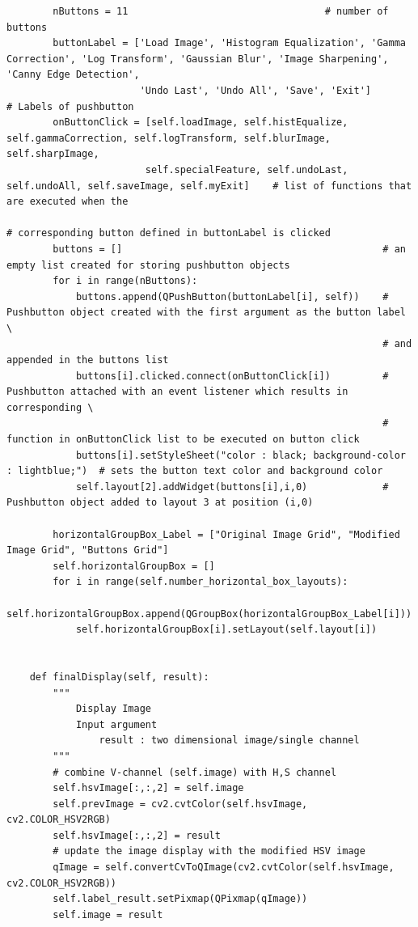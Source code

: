 \documentclass[letterpaper, 10 pt, conference]{ieeeconf}  %
\begin{document}
\begin{mdframed}
\begin{lstlisting}
        nButtons = 11                                  # number of buttons
        buttonLabel = ['Load Image', 'Histogram Equalization', 'Gamma Correction', 'Log Transform', 'Gaussian Blur', 'Image Sharpening', 'Canny Edge Detection', 
                       'Undo Last', 'Undo All', 'Save', 'Exit']          # Labels of pushbutton
        onButtonClick = [self.loadImage, self.histEqualize, self.gammaCorrection, self.logTransform, self.blurImage, self.sharpImage, 
                        self.specialFeature, self.undoLast, self.undoAll, self.saveImage, self.myExit]    # list of functions that are executed when the 
                                                                                                # corresponding button defined in buttonLabel is clicked
        buttons = []                                             # an empty list created for storing pushbutton objects
        for i in range(nButtons):
            buttons.append(QPushButton(buttonLabel[i], self))    # Pushbutton object created with the first argument as the button label \
                                                                 # and appended in the buttons list
            buttons[i].clicked.connect(onButtonClick[i])         # Pushbutton attached with an event listener which results in corresponding \
                                                                 # function in onButtonClick list to be executed on button click
            buttons[i].setStyleSheet("color : black; background-color : lightblue;")  # sets the button text color and background color
            self.layout[2].addWidget(buttons[i],i,0)             # Pushbutton object added to layout 3 at position (i,0)

        horizontalGroupBox_Label = ["Original Image Grid", "Modified Image Grid", "Buttons Grid"]
        self.horizontalGroupBox = []
        for i in range(self.number_horizontal_box_layouts):
            self.horizontalGroupBox.append(QGroupBox(horizontalGroupBox_Label[i]))
            self.horizontalGroupBox[i].setLayout(self.layout[i])

    
    def finalDisplay(self, result):
        """
            Display Image
            Input argument 
                result : two dimensional image/single channel
        """
        # combine V-channel (self.image) with H,S channel
        self.hsvImage[:,:,2] = self.image
        self.prevImage = cv2.cvtColor(self.hsvImage, cv2.COLOR_HSV2RGB)
        self.hsvImage[:,:,2] = result
        # update the image display with the modified HSV image
        qImage = self.convertCvToQImage(cv2.cvtColor(self.hsvImage, cv2.COLOR_HSV2RGB))
        self.label_result.setPixmap(QPixmap(qImage))
        self.image = result


\end{lstlisting}
\end{mdframed}
\end{document}
